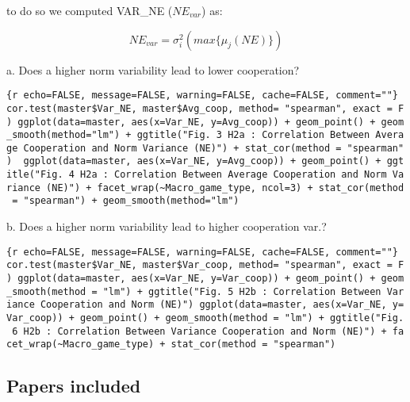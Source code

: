 to do so we computed VAR\_NE (\(NE_{var}\)) as:

\[ NE_{var} = \sigma^2_{i}(max\{\mu_j(NE)\}) \]

a. Does a higher norm variability lead to lower cooperation?

\texttt{\{r\ echo=FALSE,\ message=FALSE,\ warning=FALSE,\ cache=FALSE,\ comment=""\}\ cor.test(master\$Var\_NE,\ master\$Avg\_coop,\ method=\ "spearman",\ exact\ =\ F)\ ggplot(data=master,\ aes(x=Var\_NE,\ y=Avg\_coop))\ +\ geom\_point()\ +\ geom\_smooth(method="lm")\ +\ ggtitle("Fig.\ 3\ H2a\ :\ Correlation\ Between\ Average\ Cooperation\ and\ Norm\ Variance\ (NE)")\ +\ stat\_cor(method\ =\ "spearman")\ \ ggplot(data=master,\ aes(x=Var\_NE,\ y=Avg\_coop))\ +\ geom\_point()\ +\ ggtitle("Fig.\ 4\ H2a\ :\ Correlation\ Between\ Average\ Cooperation\ and\ Norm\ Variance\ (NE)")\ +\ facet\_wrap(\textasciitilde{}Macro\_game\_type,\ ncol=3)\ +\ stat\_cor(method\ =\ "spearman")\ +\ geom\_smooth(method="lm")}

b. Does a higher norm variability lead to higher cooperation var.?

\texttt{\{r\ echo=FALSE,\ message=FALSE,\ warning=FALSE,\ cache=FALSE,\ comment=""\}\ cor.test(master\$Var\_NE,\ master\$Var\_coop,\ method=\ "spearman",\ exact\ =\ F)\ ggplot(data=master,\ aes(x=Var\_NE,\ y=Var\_coop))\ +\ geom\_point()\ +\ geom\_smooth(method\ =\ "lm")\ +\ ggtitle("Fig.\ 5\ H2b\ :\ Correlation\ Between\ Variance\ Cooperation\ and\ Norm\ (NE)")\ ggplot(data=master,\ aes(x=Var\_NE,\ y=Var\_coop))\ +\ geom\_point()\ +\ geom\_smooth(method\ =\ "lm")\ +\ ggtitle("Fig.\ 6\ H2b\ :\ Correlation\ Between\ Variance\ Cooperation\ and\ Norm\ (NE)")\ +\ facet\_wrap(\textasciitilde{}Macro\_game\_type)\ +\ stat\_cor(method\ =\ "spearman")}

\hypertarget{papers-included}{%
\subsection{Papers included}\label{papers-included}}

